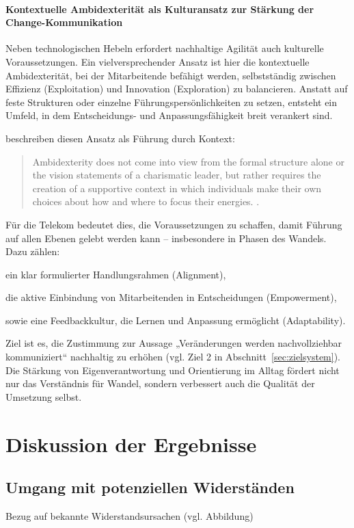 \documentclass[12pt,a4paper]{article}
\begin{document}
\paragraph{Kontextuelle Ambidexterität als Kulturansatz zur Stärkung der Change-Kommunikation}


Neben technologischen Hebeln erfordert nachhaltige Agilität auch kulturelle Voraussetzungen. Ein vielversprechender Ansatz ist hier die kontextuelle Ambidexterität, bei der Mitarbeitende befähigt werden, selbstständig zwischen Effizienz (Exploitation) und Innovation (Exploration) zu balancieren. Anstatt auf feste Strukturen oder einzelne Führungspersönlichkeiten zu setzen, entsteht ein Umfeld, in dem Entscheidungs- und Anpassungsfähigkeit breit verankert sind.

\noindent\textcite{kumkale_organizational_2022} beschreiben diesen Ansatz als Führung durch Kontext:
\begin{quote}
	Ambidexterity does not come into view from the formal structure alone or the vision statements of a charismatic leader, but rather requires the creation of a supportive context in which individuals make their own choices about how and where to focus their energies. \parencite[18]{kumkale_organizational_2022}.
\end{quote}



\noindent Für die Telekom bedeutet dies, die Voraussetzungen zu schaffen, damit Führung auf allen Ebenen gelebt werden kann – insbesondere in Phasen des Wandels. Dazu zählen:

ein klar formulierter Handlungsrahmen (Alignment),

die aktive Einbindung von Mitarbeitenden in Entscheidungen (Empowerment),

sowie eine Feedbackkultur, die Lernen und Anpassung ermöglicht (Adaptability).

\noindent Ziel ist es, die Zustimmung zur Aussage „Veränderungen werden nachvollziehbar kommuniziert“ nachhaltig zu erhöhen (vgl. Ziel 2 in Abschnitt~\ref{sec:zielsystem}). Die Stärkung von Eigenverantwortung und Orientierung im Alltag fördert nicht nur das Verständnis für Wandel, sondern verbessert auch die Qualität der Umsetzung selbst.
	
	\section{Diskussion der Ergebnisse}
		\subsection{Umgang mit potenziellen Widerständen}
	Bezug auf bekannte Widerstandsursachen (vgl. Abbildung)
	
\end{document}
